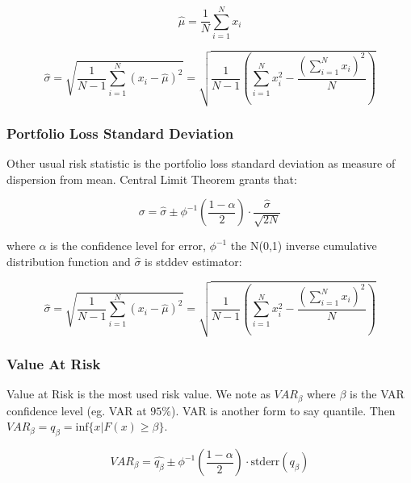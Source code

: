 \documentclass[a4paper,12pt,final]{article}
\begin{document}
\begin{displaymath}
\widehat{\mu} = \frac{1}{N} \sum_{i=1}^{N} x_i
\end{displaymath}

\begin{displaymath}
\widehat{\sigma} =
\sqrt{\frac{1}{N-1} \sum_{i=1}^{N} \left( x_i - \widehat{\mu} \right)^2} =
\sqrt{\frac{1}{N-1} \left( \sum_{i=1}^{N} x_i^2 - \frac{\left(\sum_{i=1}^{N} x_i \right)^2}{N} \right)}
\end{displaymath}

\subsubsection{Portfolio Loss Standard Deviation}
Other usual risk statistic is the portfolio loss standard deviation as measure
of dispersion from mean. Central Limit Theorem \cite{stats:schaum} grants that:

\begin{displaymath}
\sigma = \widehat{\sigma} \pm \phi^{-1}\left(\frac{1-\alpha}{2}\right) \cdot \frac{\widehat{\sigma}}{\sqrt{2N}}
\end{displaymath}

where $\alpha$ is the confidence level for error, $\phi^{-1}$ the N(0,1) inverse 
cumulative distribution function and $\widehat{\sigma}$ is stddev estimator:

\begin{displaymath}
\widehat{\sigma} =
\sqrt{\frac{1}{N-1} \sum_{i=1}^{N} \left( x_i - \widehat{\mu} \right)^2} =
\sqrt{\frac{1}{N-1} \left( \sum_{i=1}^{N} x_i^2 - \frac{\left(\sum_{i=1}^{N} x_i \right)^2}{N} \right)}
\end{displaymath}

\subsubsection{Value At Risk}
Value at Risk \cite{var:jorion} is the most used risk value. We note as 
$VAR_{\beta}$ where $\beta$ is the VAR confidence level (eg. VAR at $95\%$).
VAR is another form to say quantile. Then
$VAR_{\beta} = q_{\beta} = \textrm{inf}\{x | F(x) \geq \beta \}$. 

\begin{displaymath}
VAR_{\beta} = \widehat{q_{\beta}} \pm \phi^{-1}\left(\frac{1-\alpha}{2}\right) \cdot \textrm{stderr}(q_{\beta})
\end{displaymath}
\end{document}
